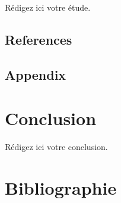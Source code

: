 \documentclass[12pt]{ulaval}
\begin{document}
Rédigez ici votre étude.

\hypertarget{references-1}{%
\section{References}\label{references-1}}

\hypertarget{appendix-1}{%
\section{Appendix}\label{appendix-1}}

\hypertarget{conclusion}{%
\chapter*{Conclusion}\label{conclusion}}

Rédigez ici votre conclusion.

\backmatter

\hypertarget{bibliographie}{%
\chapter*{Bibliographie}\label{bibliographie}}


\noindent

\setlength{\parindent}{-0.20in}
\setlength{\leftskip}{0.20in}
\setlength{\parskip}{8pt}


\end{document}
